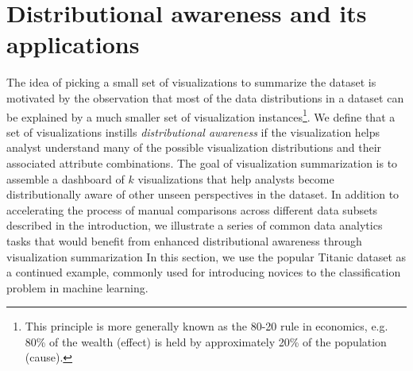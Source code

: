 \section{Distributional awareness and its applications\label{sec:distributionaware}}
The idea of picking a small set of visualizations to summarize the dataset is motivated by the observation that most of the data distributions in a dataset can be explained by a much smaller set of visualization instances\footnote{This principle is more generally known as the 80-20 rule in economics, e.g. 80\% of the wealth (effect) is held by approximately 20\% of the population (cause).}. We define that a set of visualizations instills \emph{ distributional awareness} if the visualization helps analyst understand many of the possible visualization distributions and their associated attribute combinations. The goal of visualization summarization is to assemble a dashboard of $k$ visualizations that help analysts become distributionally aware of other unseen perspectives in the dataset. In addition to accelerating the process of manual comparisons across different data subsets described in the introduction, we illustrate a series of common data analytics tasks that would benefit from enhanced distributional awareness through visualization summarization In this section, we use the popular Titanic dataset as a continued example, commonly used for introducing novices to the classification problem in machine learning\cite{titanic}.
